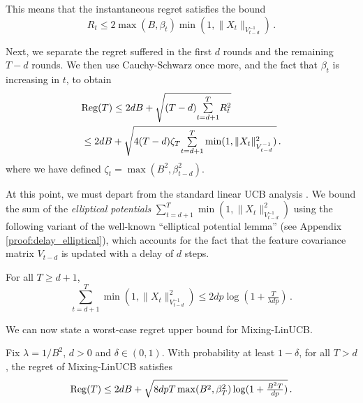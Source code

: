 This means that the instantaneous regret satisfies the bound
\begin{equation}
R_t \leq 2\max(B, \beta_{t})\min(1, \|X_t\|_{V_{t-d}^{-1}})\,.\label{eqn:inst_reg}
\end{equation}



Next, we separate the regret suffered in the first $d$ rounds and the remaining $T-d$ rounds. We then use Cauchy-Schwarz once more, and the fact that $\beta_{t}$ is increasing in $t$, to obtain
\begin{align*}
&\mathrm{Reg}(T) \leq 2dB + \sqrt{(T-d){\textstyle\sum\limits_{t=d+1}^{T}}R_t^2}\\
&\leq 2dB + \sqrt{4(T-d)\zeta_{T}{\textstyle\sum\limits_{t=d+1}^{T}}\min(1, \|X_t\|_{V_{t-d}^{-1}}^2)}\,.
\end{align*}
where we have defined $\zeta_t=\max(B^2, \beta_{t-d}^2).$



At this point, we must depart from the standard linear UCB analysis \citep{abbasi2011improved, lattimore2020bandit}. We bound the sum of the \emph{elliptical potentials} $\sum\limits_{t=d+1}^{T}\min(1, \|X_t\|_{V_{t-d}^{-1}}^2)$ using the following variant of the well-known ``elliptical potential lemma'' (see Appendix \ref{proof:delay_elliptical}), which accounts for the fact that the feature covariance matrix $V_{t-d}$ is updated with a delay of $d$ steps.
\begin{lemma}
For all $T \geq d+1$,
\begin{equation*}
\sum_{t=d+1}^{T}\min\left(1, \|X_t\|_{V_{t-d}^{-1}}^2\right) \leq 2dp\log(1 + \tfrac{T}{\lambda dp})\,.
\end{equation*}
\label{lem:delay_elliptical}
\end{lemma}

We can now state a worst-case regret upper bound for Mixing-LinUCB.



\begin{theorem}
\label{theorem:regret_bound}

Fix $\lambda = 1/B^2$, $d>0$ and $\delta\in(0,1)$. With probability at least $1 - \delta$, for all $T > d$, the regret of Mixing-LinUCB satisfies
\begin{align*}
\mathrm{Reg}(T) \leq 2dB + \sqrt{8dpT\max(B^2, \beta_{T}^2)\log(1 + \tfrac{B^2T}{dp})}\,.
\end{align*}
\label{thm:worst_case_reg}
\end{theorem}

